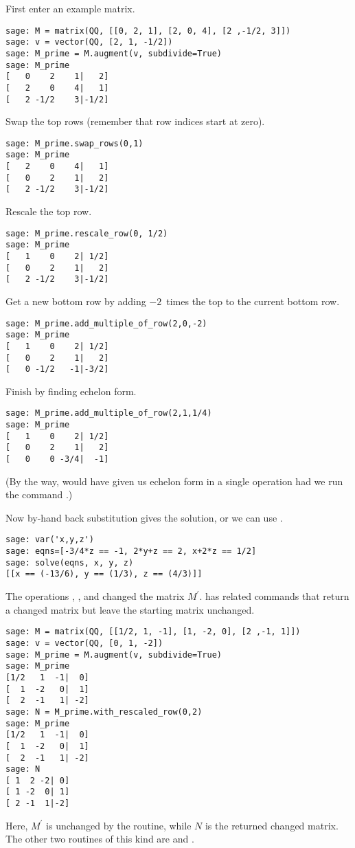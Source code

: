 First enter an example matrix.
\begin{lstlisting}
sage: M = matrix(QQ, [[0, 2, 1], [2, 0, 4], [2 ,-1/2, 3]])
sage: v = vector(QQ, [2, 1, -1/2])                        
sage: M_prime = M.augment(v, subdivide=True)              
sage: M_prime                                             
[   0    2    1|   2]
[   2    0    4|   1]
[   2 -1/2    3|-1/2]
\end{lstlisting}
Swap the top rows (remember that row indices start at zero).
\begin{lstlisting}
sage: M_prime.swap_rows(0,1)
sage: M_prime
[   2    0    4|   1]
[   0    2    1|   2]
[   2 -1/2    3|-1/2]
\end{lstlisting}
Rescale the top row.
\begin{lstlisting}
sage: M_prime.rescale_row(0, 1/2)
sage: M_prime
[   1    0    2| 1/2]
[   0    2    1|   2]
[   2 -1/2    3|-1/2]  
\end{lstlisting}
Get a new  bottom row by adding $-2$~times the top to the current bottom
row.
\begin{lstlisting}
sage: M_prime.add_multiple_of_row(2,0,-2)
sage: M_prime
[   1    0    2| 1/2]
[   0    2    1|   2]
[   0 -1/2   -1|-3/2]  
\end{lstlisting}
Finish by finding echelon form.
\begin{lstlisting}
sage: M_prime.add_multiple_of_row(2,1,1/4)
sage: M_prime                             
[   1    0    2| 1/2]
[   0    2    1|   2]
[   0    0 -3/4|  -1]  
\end{lstlisting}
(By the way,
\Sage{} would have given us echelon form in a single operation 
had we run the command
.)

Now by-hand back substitution gives the solution, or we can 
use .
\begin{lstlisting}
sage: var('x,y,z')
sage: eqns=[-3/4*z == -1, 2*y+z == 2, x+2*z == 1/2]
sage: solve(eqns, x, y, z)
[[x == (-13/6), y == (1/3), z == (4/3)]]
\end{lstlisting}

The operations ,
, and 
changed the matrix $M^\prime$.
\Sage{} has related commands that return a changed matrix
but leave the starting matrix unchanged.
\begin{lstlisting}
sage: M = matrix(QQ, [[1/2, 1, -1], [1, -2, 0], [2 ,-1, 1]])
sage: v = vector(QQ, [0, 1, -2])
sage: M_prime = M.augment(v, subdivide=True) 
sage: M_prime
[1/2   1  -1|  0]
[  1  -2   0|  1]
[  2  -1   1| -2]
sage: N = M_prime.with_rescaled_row(0,2)
sage: M_prime
[1/2   1  -1|  0]
[  1  -2   0|  1]
[  2  -1   1| -2]
sage: N      
[ 1  2 -2| 0]
[ 1 -2  0| 1]
[ 2 -1  1|-2]  
\end{lstlisting}
Here, $M^\prime$ is unchanged by the routine, while $N$ is the returned 
changed matrix.
The other two routines of this kind are  
and .




